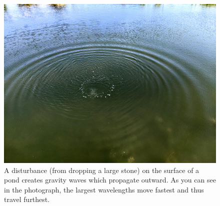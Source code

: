 \begin{figure}
\centering\includegraphics[width=0.8\linewidth]{Figures/Chapter5/fig_gravity_ripples}
\caption{A disturbance (from dropping a large stone) on the surface of a pond creates gravity waves which propagate outward.  As you can see in the photograph, the largest wavelengths move fastest and thus travel furthest.}
\label{fig_gravity_ripples}
\end{figure}

